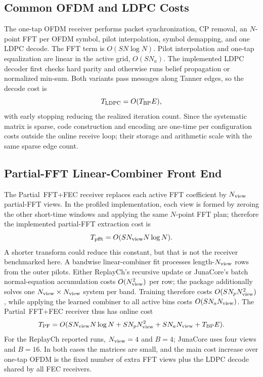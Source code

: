 \documentclass[journal]{IEEEtran}
\begin{document}
\subsection{Common OFDM and LDPC Costs}
The one-tap OFDM receiver performs packet synchronization, CP removal, an
$N$-point FFT per OFDM symbol, pilot interpolation, symbol demapping, and one
LDPC decode. The FFT term is $O(SN\log N)$. Pilot interpolation and one-tap
equalization are linear in the active grid, $O(SN_a)$. The implemented LDPC
decoder first checks hard parity and otherwise runs belief propagation or
normalized min-sum. Both variants pass messages along Tanner edges, so the
decode cost is
\begin{equation}
  T_{\rm LDPC}=O(T_{\rm BP}E),
  \label{eq:ldpc-complexity}
\end{equation}
with early stopping reducing the realized iteration count. Since the systematic
matrix is sparse, code construction and encoding are one-time per configuration
costs outside the online receive loop; their storage and arithmetic scale with
the same sparse edge count.

\subsection{Partial-FFT Linear-Combiner Front End}
The Partial~FFT+FEC receiver replaces each active FFT coefficient by
$N_{\rm view}$ partial-FFT views. In the profiled implementation, each view is
formed by zeroing the other short-time windows and applying the same
$N$-point FFT plan; therefore the implemented
partial-FFT extraction cost is
\begin{equation}
  T_{\rm pfft}=O(SN_{\rm view}N\log N).
  \label{eq:pfft-cost}
\end{equation}
A shorter transform could reduce this constant, but that is not the receiver
benchmarked here. A bandwise linear-combiner fit processes length-$N_{\rm view}$
rows from the outer pilots. Either ReplayCh's recursive update or JunaCore's
batch normal-equation accumulation costs
$O(N_{\rm view}^2)$ per row; the package additionally solves one
$N_{\rm view}\times N_{\rm view}$ system per band. Training therefore costs
$O(SN_pN_{\rm view}^2)$, while applying the learned combiner to all active bins costs
$O(SN_aN_{\rm view})$. The Partial~FFT+FEC receiver thus has online cost
\begin{equation}
  T_{\rm PF}
  =O(SN_{\rm view}N\log N+SN_pN_{\rm view}^2+SN_aN_{\rm view}+T_{\rm BP}E).
  \label{eq:pf-complexity}
\end{equation}
For the ReplayCh reported runs, $N_{\rm view}=4$ and $B=4$; JunaCore uses four
views and $B=16$. In both cases the matrices are small, and the main cost
increase over one-tap OFDM is the fixed number of extra FFT views plus the LDPC
decode shared by all FEC receivers.
\end{document}
